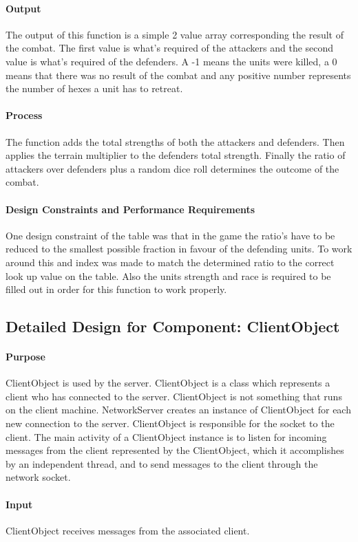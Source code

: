 \documentclass[12pt,a4paper,titlepage]{article}
\begin{document}
\paragraph{Output} The output of this function is a simple 2 value array corresponding the result of the combat. The first value is what's required of the attackers and the second value is what's required of the defenders. A -1 means the units were killed, a 0 means that there was no result of the combat and any positive number represents the number of hexes a unit has to retreat. 
\paragraph{Process} The function adds the total strengths of both the attackers and defenders. Then applies the terrain multiplier to the defenders total strength. Finally the ratio of attackers over defenders plus a random dice roll determines the outcome of the combat.  
\paragraph{Design Constraints and Performance Requirements} One design constraint of the table was that in the game the ratio's have to be reduced to the smallest possible fraction in favour of the defending units. To work around this and index was made to match the determined ratio to the correct look up value on the table. Also the units strength and race is required to be filled out in order for this function to work properly. 

\subsection{Detailed Design for Component: ClientObject }
\paragraph{Purpose} ClientObject is used by the server. ClientObject is a class which represents a client who has connected to the server. ClientObject is not something that runs on the client machine. NetworkServer creates an instance of ClientObject for each new connection to the server. ClientObject is responsible for the socket to the client. The main activity of a ClientObject instance is to listen for incoming messages from the client represented by the ClientObject, which it accomplishes by an independent thread, and to send messages to the client through the network socket.
\paragraph{Input} ClientObject receives messages from the associated client. 
\end{document}
